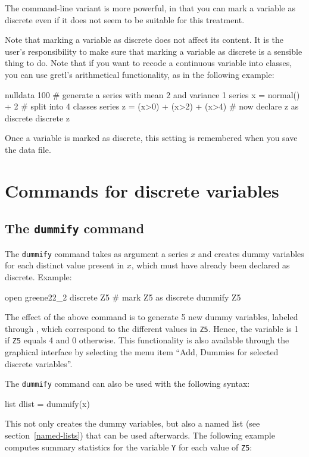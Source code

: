 The command-line variant is more powerful, in that you can mark a
variable as discrete even if it does not seem to be suitable for
this treatment.

Note that marking a variable as discrete does not affect its content.
It is the user's responsibility to make sure that marking a variable
as discrete is a sensible thing to do.  Note that if you want to
recode a continuous variable into classes, you can use gretl's
arithmetical functionality, as in the following example:
\begin{code}
nulldata 100
# generate a series with mean 2 and variance 1
series x = normal() + 2
# split into 4 classes
series z = (x>0) + (x>2) + (x>4)
# now declare z as discrete
discrete z
\end{code}

Once a variable is marked as discrete, this setting is remembered when
you save the data file.

\section{Commands for discrete variables}
\label{discr-commands}

\subsection{The \texttt{dummify} command}
\label{discr-dummify}

The \texttt{dummify} command takes as argument a series $x$ and creates
dummy variables for each distinct value present in $x$, which must
have already been declared as discrete.  Example:
\begin{code}
open greene22_2
discrete Z5 # mark Z5 as discrete
dummify Z5
\end{code}

The effect of the above command is to generate 5 new dummy variables,
labeled  through , which correspond to
the different values in \texttt{Z5}. Hence, the variable
 is 1 if \texttt{Z5} equals 4 and 0 otherwise. This
functionality is also available through the graphical interface by
selecting the menu item ``Add, Dummies for selected discrete variables''.

The \texttt{dummify} command can also be used with the following
syntax:
\begin{code}
list dlist = dummify(x)
\end{code}
This not only creates the dummy variables, but also a named list (see
section~\ref{named-lists}) that can be used afterwards. The
following example computes summary statistics for the variable \texttt{Y} for
each value of \texttt{Z5}:

